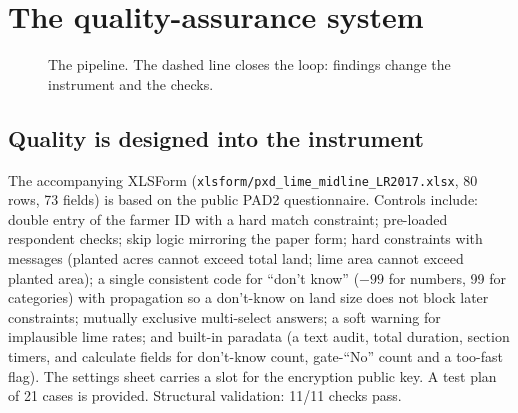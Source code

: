 \documentclass[11pt,a4paper]{article}
\begin{document}
\section{The quality-assurance system}\label{sec:system}
\begin{figure}[H]\centering
{}
\caption{The pipeline. The dashed line closes the loop: findings change the instrument and the checks.}\end{figure}

\subsection{Quality is designed into the instrument}
The accompanying XLSForm (\texttt{xlsform/pxd\_lime\_midline\_LR2017.xlsx}, 80 rows, 73 fields) is based on the public PAD2 questionnaire. Controls include: double entry of the farmer ID with a hard match constraint; pre-loaded respondent checks; skip logic mirroring the paper form; hard constraints with messages (planted acres cannot exceed total land; lime area cannot exceed planted area); a single consistent code for ``don't know'' ($-99$ for numbers, 99 for categories) with propagation so a don't-know on land size does not block later constraints; mutually exclusive multi-select answers; a soft warning for implausible lime rates; and built-in paradata (a text audit, total duration, section timers, and calculate fields for don't-know count, gate-``No'' count and a too-fast flag). The settings sheet carries a slot for the encryption public key. A test plan of 21 cases is provided. Structural validation: 11/11 checks pass.
\end{document}
